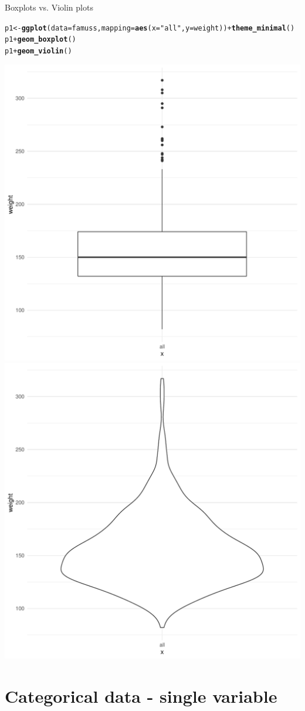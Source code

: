 \documentclass[10pt]{beamer}\usepackage[]{graphicx}\usepackage[]{color}
\makeatletter
\newcommand{\hlstr}[1]{\textcolor[rgb]{0.192,0.494,0.8}{#1}}%
\newcommand{\hlopt}[1]{\textcolor[rgb]{0,0,0}{#1}}%
\newcommand{\hlstd}[1]{\textcolor[rgb]{0.345,0.345,0.345}{#1}}%
\newcommand{\hlkwb}[1]{\textcolor[rgb]{0.69,0.353,0.396}{#1}}%
\newcommand{\hlkwc}[1]{\textcolor[rgb]{0.333,0.667,0.333}{#1}}%
\newcommand{\hlkwd}[1]{\textcolor[rgb]{0.737,0.353,0.396}{\textbf{#1}}}%
\newenvironment{kframe}{%
 \def\at@end@of@kframe{}%
 \ifinner\ifhmode%
  \def\at@end@of@kframe{\end{minipage}}%
  \begin{minipage}{\columnwidth}%
 \fi\fi%
 \def\FrameCommand##1{\hskip\@totalleftmargin \hskip-\fboxsep
 \colorbox{shadecolor}{##1}\hskip-\fboxsep
     \hskip-\linewidth \hskip-\@totalleftmargin \hskip\columnwidth}%
 \MakeFramed {\advance\hsize-\width
   \@totalleftmargin\z@ \linewidth\hsize
   \@setminipage}}%
 {\par\unskip\endMakeFramed%
 \at@end@of@kframe}
\newenvironment{knitrout}{}{} %
\makeatother
\begin{document}
\begin{frame}[fragile]{Boxplots vs. Violin plots}
	
\begin{knitrout}\scriptsize
{}\color{fgcolor}\begin{kframe}
\begin{alltt}
\hlstd{p1} \hlkwb{<-} \hlkwd{ggplot}\hlstd{(}\hlkwc{data} \hlstd{= famuss,} \hlkwc{mapping} \hlstd{=} \hlkwd{aes}\hlstd{(}\hlkwc{x} \hlstd{=} \hlstr{"all"}\hlstd{,} \hlkwc{y} \hlstd{= weight))} \hlopt{+} \hlkwd{theme_minimal}\hlstd{()}
\hlstd{p1} \hlopt{+} \hlkwd{geom_boxplot}\hlstd{()}
\hlstd{p1} \hlopt{+} \hlkwd{geom_violin}\hlstd{()}
\end{alltt}
\end{kframe}

{\centering \includegraphics[width=0.45\linewidth]{figure/unnamed-chunk-2-1} 
\includegraphics[width=0.45\linewidth]{figure/unnamed-chunk-2-2} 

}



\end{knitrout}
	
\end{frame}

		
		\hypertarget{categorical-data}{%
	\section{Categorical data - single variable}\label{categorical-data}}
		
\end{document}

